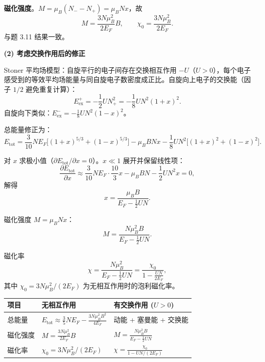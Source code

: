 \begin{derivationbox}[标准解题过程]
\textbf{磁化强度}。$M=\mu_B(N_--N_+)=\mu_BNx$，故
\begin{equation}
\boxed{M=\frac{3N\mu_B^2}{2E_F}B,\qquad \chi_0=\frac{3N\mu_B^2}{2E_F}.}
\end{equation}
与题 3.11 结果一致。

\textbf{(2) 考虑交换作用后的修正}

Stoner 平均场模型：自旋平行的电子间存在交换相互作用 $-U$（$U>0$），每个电子感受到的等效平均场能量与同自旋电子数密度成正比。自旋向上电子的交换能（因子 $1/2$ 避免重复计算）：
\begin{equation}
E_{\text{ex}}^+=-\frac{1}{2}UN_+^2=-\frac{1}{8}UN^2(1+x)^2.
\end{equation}
自旋向下类似：$E_{\text{ex}}^-=-\frac{1}{8}UN^2(1-x)^2$。

总能量修正为：
\begin{equation}
E_{\text{tot}}=\frac{3}{10}NE_F\bigl[(1+x)^{5/3}+(1-x)^{5/3}\bigr]-\mu_BBNx-\frac{1}{8}UN^2\bigl[(1+x)^2+(1-x)^2\bigr].
\end{equation}

对 $x$ 求极小值（$\partial E_{\text{tot}}/\partial x=0$）。$x\ll1$ 展开并保留线性项：
\begin{equation}
\frac{\partial E_{\text{tot}}}{\partial x}\approx\frac{3}{10}NE_F\cdot\frac{10}{3}x-\mu_BBN-\frac{1}{2}UN^2x=0,
\end{equation}
解得
\begin{equation}
x=\frac{\mu_BB}{E_F-\frac{1}{2}UN}.
\end{equation}

磁化强度 $M=\mu_BNx$：
\begin{equation}
M=\frac{N\mu_B^2B}{E_F-\frac{1}{2}UN}.
\end{equation}

磁化率
\begin{equation}
\boxed{\chi=\frac{N\mu_B^2}{E_F-\frac{1}{2}UN}=\frac{\chi_0}{1-\frac{UN}{2E_F}},}
\end{equation}
其中 $\chi_0=3N\mu_B^2/(2E_F)$ 为无相互作用时的泡利磁化率。
\end{derivationbox}

\begin{formulabox}[答案汇总]
\begin{center}
\begin{tabular}{lll}
\toprule
\textbf{项目} & \textbf{无相互作用} & \textbf{有交换作用 ($U>0$)} \\
\midrule
总能量 & $\displaystyle E_{\text{tot}}\approx\frac{3}{5}NE_F-\frac{3N\mu_B^2B^2}{4E_F}$ & 动能 + 塞曼能 + 交换能 \\
磁化强度 & $\displaystyle M=\frac{3N\mu_B^2}{2E_F}B$ & $\displaystyle M=\frac{N\mu_B^2B}{E_F-\frac{1}{2}UN}$ \\
磁化率 & $\chi_0=3N\mu_B^2/(2E_F)$ & $\displaystyle\chi=\frac{\chi_0}{1-UN/(2E_F)}$ \\
\bottomrule
\end{tabular}
\end{center}
\end{formulabox}

